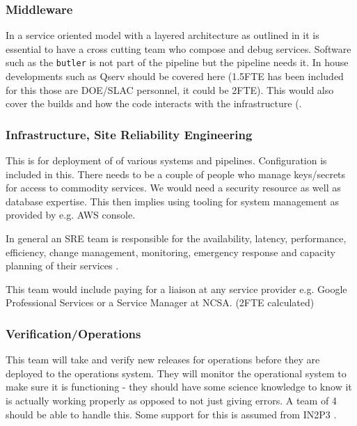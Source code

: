 \subsubsection{Middleware }
In a service oriented model with a layered architecture as outlined in  it is essential to have a cross cutting team who compose and debug services.
Software such as the \texttt{butler}  is not part of the \gls{pipeline} but the \gls{pipeline} needs it. In house developments such as \gls{Qserv} should be covered here (1.5FTE has been included for this those are  DOE/SLAC personnel, it could be 2FTE).
This would also cover the builds and how the code interacts with the infrastructure (.

\subsubsection{Infrastructure, Site Reliability Engineering  } \label{sec:infra}
This is for deployment of of various systems and pipelines. Configuration is included in this. There needs to be a couple of people who manage keys/secrets
for access to commodity services. We would need a security resource as well as database expertise.  This then implies using tooling for system management as
provided by e.g. \gls{AWS} console.

In general an \gls{SRE} team is responsible for the availability, latency, performance, efficiency, change management, monitoring, emergency response and capacity planning of their services \cite{Beyer:2016:SRE:3006357}.

This team would include paying for a liaison at any service provider e.g. Google Professional Services or a Service Manager at \gls{NCSA}. (2FTE calculated)

\subsubsection{Verification/Operations }
This team will take and verify new releases for operations before they are deployed to the operations system. They will monitor the operational system to make sure it is functioning - they should have some science knowledge to know it is actually working properly as opposed to not just giving errors. A team of 4 should be able to handle this.
Some support for this is assumed from IN2P3 .

